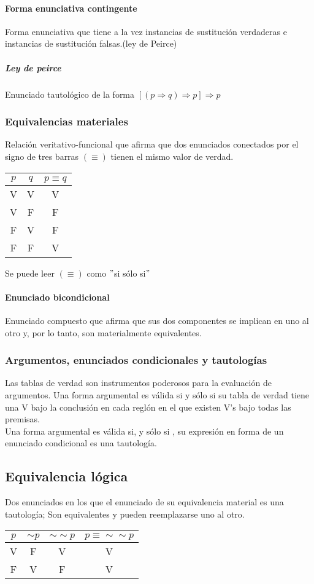 \documentclass[10pt]{book} 						%
\begin{document}
\paragraph{Forma enunciativa contingente}
Forma enunciativa que tiene a la vez instancias de sustitución verdaderas e instancias de sustitución falsas.(ley de Peirce)
\subparagraph{Ley de peirce}
Enunciado tautológico de la forma $[(p \Rightarrow q)\Rightarrow p]\Rightarrow p$
\subsubsection{Equivalencias materiales}
Relación veritativo-funcional que afirma que dos enunciados conectados por el signo de tres barras $(\equiv)$
tienen el mismo valor de verdad.
\begin{center}
\begin{tabular}{c c c}
$p$&$q$&$p \equiv q$\\
\hline
V&V&V\\
V&F&F\\
F&V&F\\
F&F&V\\
\end{tabular}
\end{center}
Se puede leer $(\equiv)$ como $"$si sólo si$"$
\paragraph{Enunciado bicondicional}
Enunciado compuesto que afirma que sus dos componentes se implican en uno al otro y, por lo tanto, son materialmente equivalentes.
\subsubsection{Argumentos, enunciados condicionales y tautologías}
Las tablas de verdad son instrumentos poderosos para la evaluación de argumentos. Una forma argumental es válida si y sólo si su tabla de verdad tiene una V bajo la conclusión en cada reglón en el que existen V's bajo todas las premisas.\\
Una forma argumental es válida si, y sólo si , su expresión en forma de un enunciado condicional es una tautología.

\subsection{Equivalencia lógica}
Dos enunciados en los que el enunciado de su equivalencia material es una tautología; Son equivalentes y pueden reemplazarse uno al otro.
\begin{center}
\begin{tabular}{c c c c}
$p$&$\sim p$&$\sim \sim p$&$p \equiv \sim \sim p$\\
\hline
V&F&V&V\\
F&V&F&V
\end{tabular}
\end{center}
\end{document}
